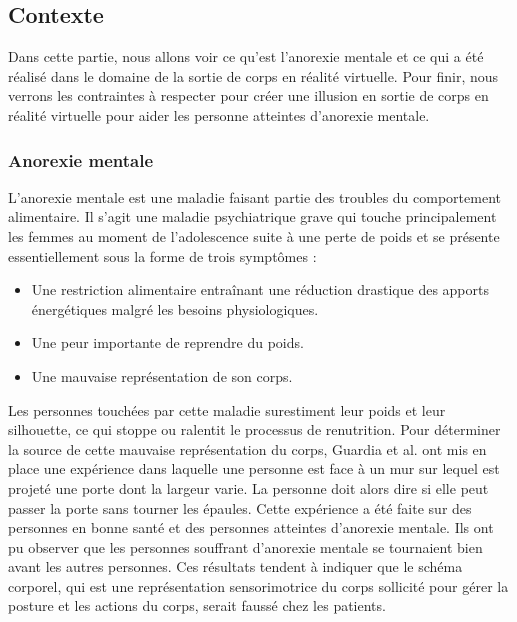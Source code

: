 \subsection{Contexte}

Dans cette partie, nous allons voir ce qu'est l'anorexie mentale et ce qui a été réalisé dans le domaine de la sortie de corps en réalité virtuelle. Pour finir, nous verrons les contraintes à respecter pour créer une illusion en sortie de corps en réalité virtuelle pour aider les personne atteintes d'anorexie mentale.
\subsubsection{Anorexie mentale}

L'anorexie mentale est une maladie faisant partie des troubles du comportement alimentaire. Il s'agit une maladie psychiatrique grave qui touche principalement les femmes au moment de l'adolescence suite à une perte de poids et se présente essentiellement sous la forme de trois symptômes :
\begin{itemize}
\item Une restriction alimentaire entraînant une réduction drastique des apports énergétiques malgré les besoins physiologiques.
\item Une peur importante de reprendre du poids.
\item Une mauvaise représentation de son corps.
\end{itemize}

Les personnes touchées par cette maladie surestiment leur poids et leur silhouette, ce qui stoppe ou ralentit le processus de renutrition. Pour déterminer la source de cette mauvaise représentation du corps, Guardia et al. \cite{gu10} ont mis en place une expérience dans laquelle une personne est face à un mur sur lequel est projeté une porte dont la largeur varie. La personne doit alors dire si elle peut passer la porte sans tourner les épaules. Cette expérience a été faite sur des personnes en bonne santé et des personnes atteintes d'anorexie mentale. Ils ont pu observer que les personnes souffrant d'anorexie mentale se tournaient bien avant les autres personnes. Ces résultats tendent à indiquer que le schéma corporel, qui est une représentation sensorimotrice du corps sollicité pour gérer la posture et les actions du corps, serait faussé chez les patients.\\

